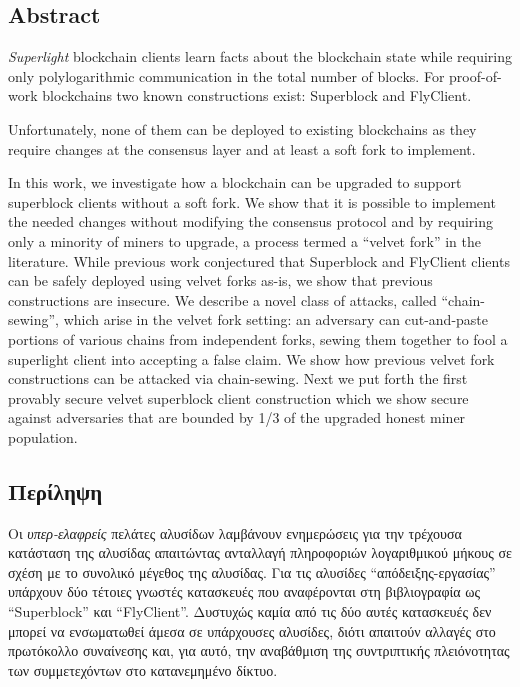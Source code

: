 \begin{center}
    \section*{Abstract}
\end{center}
{\em Superlight} blockchain clients
learn facts about the blockchain state
while requiring only polylogarithmic communication in the total
number of blocks.
For proof-of-work blockchains
two known constructions exist: Superblock and FlyClient.

Unfortunately, none of them can be deployed to existing blockchains as they require changes at the consensus layer and at least a soft fork to implement.

In this work, we
investigate how a blockchain can be upgraded to support superblock clients without a soft fork. We show that it is possible to implement the needed changes without modifying the consensus protocol and by requiring only a minority of miners to upgrade, a process termed a ``velvet fork'' in the literature. While previous work conjectured that Superblock and FlyClient clients can be safely deployed using velvet forks as-is, we show that previous constructions are insecure. We describe a novel class of attacks, called  ``chain-sewing'', which arise in the velvet fork setting: an adversary can cut-and-paste portions of various chains from independent forks, sewing them together to
fool a superlight client into accepting a false claim.
We show how previous velvet fork constructions can be attacked via chain-sewing.
Next we put forth the first provably secure velvet superblock client construction which we show  secure against adversaries that are bounded by 1/3 of the upgraded honest miner population.

\newpage
\begin{center}
    \section*{Περίληψη}
\end{center}
Οι \emph{υπερ-ελαφρείς} πελάτες αλυσίδων λαμβάνουν ενημερώσεις για την τρέχουσα κατάσταση της αλυσίδας απαιτώντας ανταλλαγή πληροφοριών λογαριθμικού μήκους σε σχέση με το συνολικό μέγεθος της αλυσίδας. Για τις αλυσίδες ``απόδειξης-εργασίας'' υπάρχουν δύο τέτοιες γνωστές κατασκευές που αναφέρονται στη βιβλιογραφία ως ``Superblock'' και ``FlyClient''. Δυστυχώς καμία από τις δύο αυτές κατασκευές δεν μπορεί να ενσωματωθεί άμεσα σε υπάρχουσες αλυσίδες, διότι απαιτούν αλλαγές στο πρωτόκολλο συναίνεσης και, για αυτό, την αναβάθμιση της συντριπτικής πλειόνοτητας των συμμετεχόντων στο κατανεμημένο δίκτυο. 

